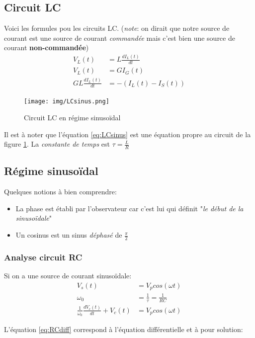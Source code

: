 \documentclass{report}
\begin{document}
\subsection{Circuit LC}
Voici les formules pou les circuits LC. (\textit{note}: on dirait que notre source de courant est une source de courant \textit{commandée} mais c'est bien une source de courant \textbf{non-commandée})
\begin{align}
V_L(t) &= L \frac{dI_L(t)}{dt}\\
V_L(t) &= GI_G(t)\\
GL \frac{dI_L(t)}{dt} &= -(I_L(t)-I_S(t))\label{eq:LCsinus}
\end{align}

\begin{figure}[H]
\centering
\texttt{[image: img/LCsinus.png]} \label{img:LCsinus}
\caption{Circuit LC en régime sinusoïdal}
\end{figure}

Il est à noter que l'équation \ref{eq:LCsinus} est une équation propre au circuit de la figure \ref{img:LCsinus}. La \textit{constante de temps} est $\tau = \frac{L}{R}$

\subsection{Régime sinusoïdal}
Quelques notions à bien comprendre:
\begin{itemize}
\item La phase est établi par l'observateur car c'est lui qui définit "\textit{le début de la sinusoïdale}"
\item Un cosinus est un sinus \textit{déphasé} de $\frac{\pi}{2}$
\end{itemize}

\subsubsection{Analyse circuit RC}
Si on a une source de courant sinusoïdale:
\begin{align}
V_s(t) &= V_p cos(\omega t)\\
\omega_0 &= \frac{1}{\tau} = \frac{1}{RC}\\
\frac{1}{\omega_0}\frac{dV_c(t)}{dt} + V_c(t) &= V_p cos(\omega t) \label{eq:RCdiff}
\end{align}

L'équation \ref{eq:RCdiff} correspond à l'équation différentielle et à pour solution:
\end{document}

